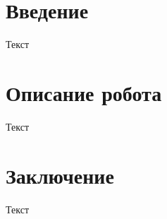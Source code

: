\section*{Введение}
Текст

\newpage
\section{Описание робота}
Текст

\newpage
\section*{Заключение}
Текст
